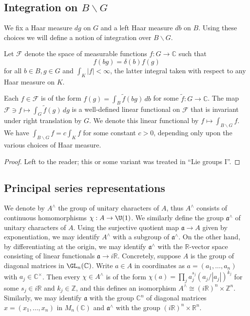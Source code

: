 \documentclass[reqno]{amsart} 
\begin{document}
\subsection{Integration on \texorpdfstring{$B \backslash G$}{B \ G}}\label{sec:integr-b-backsl}
We fix a Haar measure $d g$ on $G$ and a left Haar measure $d b$ on $B$.  Using these choices we will define a notion of integration over $B \backslash G$.

Let $\mathcal{F}$ denote the space of measurable functions $f : G \rightarrow \mathbb{C}$ such that
\begin{equation*}
  f(b g) = \delta(b) f(g)
\end{equation*}
for all $b \in B, g \in G$ and $\int_K |f| < \infty$, the latter integral taken with respect to any Haar measure on $K$.

\begin{lemma}
  Each $f \in \mathcal{F}$ is of the form $f(g) = \int_{B} \tilde{f}(b g) \, d b$ for some $\tilde{f} : G \rightarrow \mathbb{C}$.  The map $\mathcal{F} \ni f \mapsto \int_G \tilde{f}(g) \, d g$ is a well-defined linear functional on $\mathcal{F}$ that is invariant under right translation by $G$.  We denote this linear functional by $f \mapsto \int_{B \backslash G} f$.  We have $\int_{B \backslash G} f = c \int_K f$ for some constant $c > 0$, depending only upon the various choices of Haar measure.
\end{lemma}
\begin{proof}
  Left to the reader; this or some variant was treated in ``Lie groups I''.
\end{proof}

\subsection{Principal series representations}
We denote by $A^\wedge$ the group of unitary characters of $A$, thus $A^\wedge$ consists of continuous homomorphisms $\chi : A \rightarrow \U(1)$.  We similarly define the group $\mathfrak{a}^\wedge$ of unitary characters of $A$.  Using the surjective quotient map $\mathfrak{a} \rightarrow A$ given by exponentiation, we may identify $A^\wedge$ with a subgroup of $\mathfrak{a}^\wedge$.  On the other hand, by differentiating at the origin, we may identify $\mathfrak{a}^\wedge$ with the $\mathbb{R}$-vector space consisting of linear functionals $\mathfrak{a} \rightarrow i\mathbb{R}$.  Concretely, suppose $A$ is the group of diagonal matrices in $\GL_n(\mathbb{C})$.  Write $a \in A$ in coordinates as $a = (a_1,\dotsc,a_n)$ with $a_j \in \mathbb{C}^\times$.  Then every $\chi \in A^\wedge$ is of the form $\chi(a) = \prod_j a_j^{s_j} (a_j/|a_j|)^{k_j}$ for some $s_j \in i \mathbb{R}$ and $k_j \in \mathbb{Z}$, and this defines an isomorphism $A^\wedge \cong (i \mathbb{R})^n \times \mathbb{Z}^n$.  Similarly, we may identify $\mathfrak{a}$ with the group $\mathbb{C}^n$ of diagonal matrices $x = (x_1,\dotsc,x_n)$ in $M_n(\mathbb{C})$ and $\mathfrak{a}^\wedge$ with the group $(i \mathbb{R})^n \times \mathbb{R}^n$.
\end{document}
